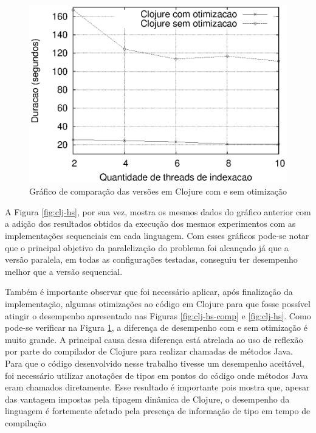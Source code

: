 \begin{figure}[h]
 \centering
 \includegraphics[scale=0.85]{imagens/clojure-opt.eps}
 \caption{Gráfico de comparação das versões em Clojure com e sem otimização}
 \label{fig:clj-opt}
\end{figure}

A Figura \ref{fig:clj-hs}, por sua vez, mostra os mesmos dados do gráfico anterior com a adição dos resultados obtidos da execução dos mesmos experimentos com as implementações sequenciais em cada linguagem. Com esses gráficos pode-se notar que o principal objetivo da paralelização do problema foi alcançado já que a versão paralela, em todas as configurações testadas, conseguiu ter desempenho melhor que a versão sequencial.

Também é importante observar que foi necessário aplicar, após finalização da implementação, algumas otimizações ao código em Clojure para que fosse possível atingir o desempenho apresentado nas Figuras \ref{fig:clj-hs-comp} e \ref{fig:clj-hs}. Como pode-se verificar na Figura \ref{fig:clj-opt}, a diferença de desempenho com e sem otimização é muito grande. A principal causa dessa diferença está atrelada ao uso de reflexão por parte do compilador de Clojure para realizar chamadas de métodos Java. Para que o código desenvolvido nesse trabalho tivesse um desempenho aceitável, foi necessário utilizar anotações de tipos em pontos do código onde métodos Java eram chamados diretamente. Esse resultado é importante pois mostra que, apesar das vantagem impostas pela tipagem dinâmica de Clojure, o desempenho da linguagem é fortemente afetado pela presença de informação de tipo em tempo de compilação


